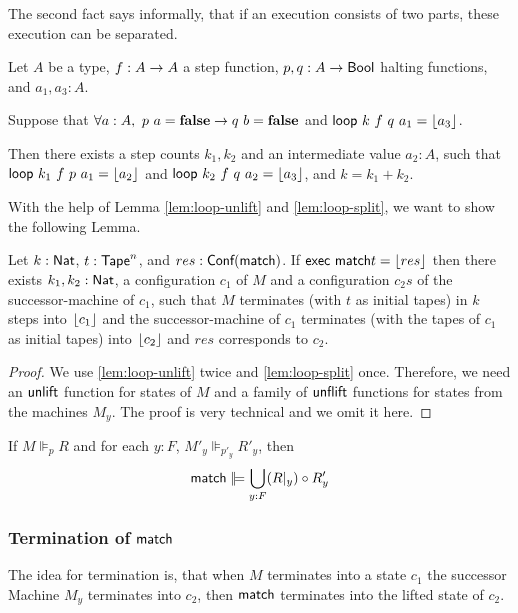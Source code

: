 \documentclass{psartcl}
\begin{document}
The second fact says informally, that if an execution consists of two parts, these execution can be separated.

\begin{lemma}
  \label{lem:loop-split}
  Let $A$ be a type, $f : A \rightarrow A$ a step function, $p, q : A \rightarrow \textsf{Bool}$ halting functions, and $a_1, a_3:A$.

  Suppose that $\forall a:A,~p~a = \mathbf{false} \rightarrow q~b = \mathbf{false}$ and $\textsf{loop}~k~f~q~a_1 = \left\lfloor {a_3}\right\rfloor$.

  Then there exists a step counts $k_1, k_2$ and an intermediate value $a_2:A$, such that
  $\textsf{loop}~k_1~f~p~a_1 = \left\lfloor {a_2}\right\rfloor$ and $\textsf{loop}~k_2~f~q~a_2 = \left\lfloor {a_3}\right\rfloor$, and $k = k_1 + k_2$.
\end{lemma}

With the help of Lemma \ref{lem:loop-unlift} and \ref{lem:loop-split}, we want to show the following Lemma.
\begin{lemma}
  \label{lem:match-split}
  Let $k:\textsf{Nat}$, $t:\textsf{Tape}^{n}$, and $res:\textsf{Conf}(\textsf{match})$.
  If $\textsf{exec}~\textsf{match} t = \left\lfloor {res}\right\rfloor$ then
  there exists $k_1,k_2:\textsf{Nat}$, a configuration $c_1$ of $M$ and a configuration $c_2s$ of the successor-machine of $c_1$,
  such that $M$ terminates (with $t$ as initial tapes) in $k$ steps into $\left\lfloor {c_1}\right\rfloor$ and the successor-machine of $c_1$ terminates (with the tapes of
  $c_1$ as initial tapes) into $\left\lfloor {c_2}\right\rfloor$ and $res$ corresponds to $c_2$.
\end{lemma}
\begin{proof}
  We use \ref{lem:loop-unlift} twice and \ref{lem:loop-split} once.  Therefore, we need an $\textsf{unlift}$ function for states of $M$ and a family of
  $\textsf{unflift}$ functions for states from the machines $M_y$.  The proof is very technical and we omit it here.
\end{proof}

\begin{lemma}
  \label{lem:match}
  If $M \VDash_p R$ and for each $y:F$, $M'_y \VDash_{p'_y} R'_y$, then
  $$\MS{match} \VDash \bigcup_{y:F} (R \at y) \circ R'_y$$
\end{lemma}

\subsubsection{Termination of $\textsf{match}$}

The idea for termination is, that when $M$ terminates into a state $c_1$ the successor Machine $M_y$ terminates into $c_2$, then $\textsf{match}$
terminates into the lifted state of $c_2$.
\end{document}
